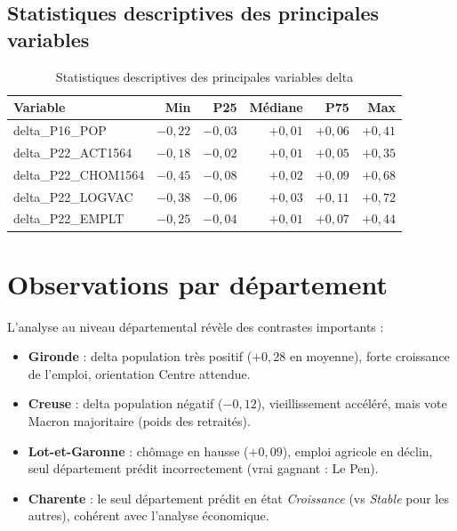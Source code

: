 \subsection{Statistiques descriptives des principales variables}

\begin{table}[H]
\centering
\caption{Statistiques descriptives des principales variables delta}
\label{tab:stats_desc}
\begin{tabular}{lrrrrr}
\toprule
\textbf{Variable} & \textbf{Min} & \textbf{P25} & \textbf{Médiane} & \textbf{P75} & \textbf{Max} \\
\midrule
delta\_P16\_POP    & $-0{,}22$ & $-0{,}03$ & $+0{,}01$ & $+0{,}06$ & $+0{,}41$ \\
delta\_P22\_ACT1564 & $-0{,}18$ & $-0{,}02$ & $+0{,}01$ & $+0{,}05$ & $+0{,}35$ \\
delta\_P22\_CHOM1564 & $-0{,}45$ & $-0{,}08$ & $+0{,}02$ & $+0{,}09$ & $+0{,}68$ \\
delta\_P22\_LOGVAC & $-0{,}38$ & $-0{,}06$ & $+0{,}03$ & $+0{,}11$ & $+0{,}72$ \\
delta\_P22\_EMPLT  & $-0{,}25$ & $-0{,}04$ & $+0{,}01$ & $+0{,}07$ & $+0{,}44$ \\
\bottomrule
\end{tabular}
\end{table}

\section{Observations par département}

L'analyse au niveau départemental révèle des contrastes importants :

\begin{itemize}
  \item \textbf{Gironde} : delta population très positif ($+0{,}28$ en moyenne),
    forte croissance de l'emploi, orientation Centre attendue.
  \item \textbf{Creuse} : delta population négatif ($-0{,}12$), vieillissement
    accéléré, mais vote Macron majoritaire (poids des retraités).
  \item \textbf{Lot-et-Garonne} : chômage en hausse ($+0{,}09$), emploi agricole
    en déclin, seul département prédit incorrectement (vrai gagnant : Le Pen).
  \item \textbf{Charente} : le seul département prédit en état \textit{Croissance}
    (vs \textit{Stable} pour les autres), cohérent avec l'analyse économique.
\end{itemize}

